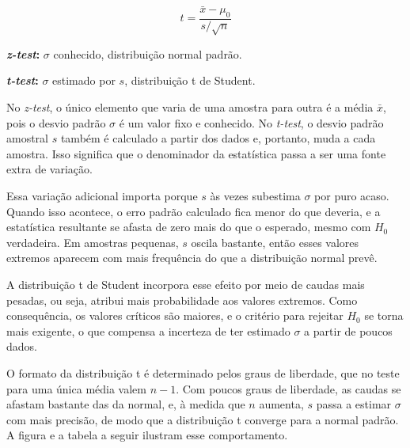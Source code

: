 {\[
t = \frac{\bar{x} - \mu_0}{s / \sqrt{n}}
\]

\begin{hypeitemize}
    \item \textbf{\textit{z-test}:} $\sigma$ conhecido, distribuição normal padrão.
    \item \textbf{\textit{t-test}:} $\sigma$ estimado por $s$, distribuição t de Student.
\end{hypeitemize}

\subtitle{Por que as caudas são mais pesadas?}

\hspace*{1.5em}
No \textit{z-test}, o único elemento que varia de uma amostra para outra é a média $\bar{x}$,
pois o desvio padrão $\sigma$ é um valor fixo e conhecido.
No \textit{t-test}, o desvio padrão amostral $s$ também é calculado a partir dos dados
e, portanto, muda a cada amostra.
Isso significa que o denominador da estatística passa a ser uma fonte extra de variação.

\hspace*{1.5em}
Essa variação adicional importa porque $s$ às vezes subestima $\sigma$ por puro acaso.
Quando isso acontece, o erro padrão calculado fica menor do que deveria,
e a estatística resultante se afasta de zero mais do que o esperado,
mesmo com $H_0$ verdadeira.
Em amostras pequenas, $s$ oscila bastante,
então esses valores extremos aparecem com mais frequência do que a distribuição normal prevê.

\hspace*{1.5em}
A distribuição t de Student incorpora esse efeito por meio de caudas mais pesadas,
ou seja, atribui mais probabilidade aos valores extremos.
Como consequência, os valores críticos são maiores,
e o critério para rejeitar $H_0$ se torna mais exigente,
o que compensa a incerteza de ter estimado $\sigma$ a partir de poucos dados.


\subtitle{Graus de liberdade e convergência}

\hspace*{1.5em}
O formato da distribuição t é determinado pelos graus de liberdade,
que no teste para uma única média valem $n - 1$.
Com poucos graus de liberdade, as caudas se afastam bastante das da normal,
e, à medida que $n$ aumenta, $s$ passa a estimar $\sigma$ com mais precisão,
de modo que a distribuição t converge para a normal padrão.
A figura e a tabela a seguir ilustram esse comportamento.

}
